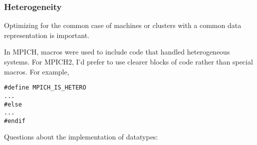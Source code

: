 \documentclass{article}
\begin{document}
\subsubsection{}

\subsubsection{}

\subsubsection{Heterogeneity}
\label{sec:hetero}
Optimizing for the common case of machines or clusters with a common
data representation is important.  

In MPICH, macros were used to include code that handled heterogeneous
systems.  For MPICH2, I'd prefer to use clearer blocks of code rather
than special macros.  For example,
\begin{verbatim}
#define MPICH_IS_HETERO
...
#else
...
#endif
\end{verbatim}

Questions about the implementation of datatypes:
\end{document}
